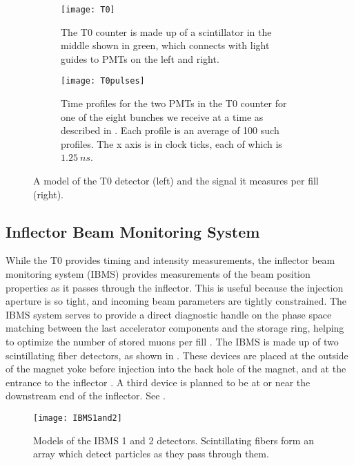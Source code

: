 \begin{figure}
\centering
    \begin{subfigure}[t]{0.45\textwidth}
        \centering
        \texttt{[image: T0]}
        \caption{The T0 counter is made up of a scintillator in the middle shown in green, which connects with light guides to PMTs on the left and right.}
    \label{fig:T0counter}
    \end{subfigure}%
    \hspace{1cm}
    \begin{subfigure}[t]{0.45\textwidth}
        \centering
        \texttt{[image: T0pulses]}
        \caption{Time profiles for the two PMTs in the T0 counter for one of the eight bunches we receive at a time as described in . Each profile is an average of 100 such profiles. The x axis is in clock ticks, each of which is $\SI{1.25}{ns}$.}
    \label{fig:T0pulses}    
    \end{subfigure}
\caption[T0 counter and pulses]{A model of the T0 detector (left) and the signal it measures per fill (right).}
\label{fig:T0}
\end{figure}


\subsection{Inflector Beam Monitoring System}
\label{sec:IBMS}

While the T0 provides timing and intensity measurements, the inflector beam monitoring system (IBMS) provides measurements of the beam position properties as it passes through the inflector. This is useful because the injection aperture is so tight, and incoming beam parameters are tightly constrained. The IBMS system serves to provide a direct diagnostic handle on the phase space matching between the last accelerator components and the \gmtwo storage ring, helping to optimize the number of stored muons per fill \cite{ibms1}. The IBMS is made up of two scintillating fiber detectors, as shown in . These devices are placed at the outside of the magnet yoke before injection into the back hole of the magnet, and at the entrance to the inflector \cite{ibms2}. A third device is planned to be at or near the downstream end of the inflector. See . 


\begin{figure}
    \centering
    \texttt{[image: IBMS1and2]}
    \caption[IBMS Models]{Models of the IBMS 1 and 2 detectors. Scintillating fibers form an array which detect particles as they pass through them.}   
    \label{fig:IBMS1and2}
\end{figure}

